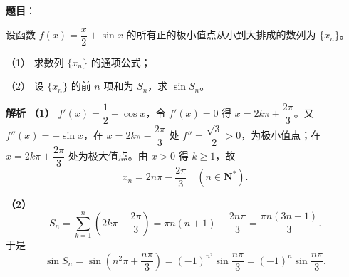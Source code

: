 \begin{answer}

\textbf{题目}：

设函数 $f(x)=\dfrac x2+\sin x$ 的所有正的极小值点从小到大排成的数列为 $\{x_n\}$。

（1） 求数列 $\{x_n\}$ 的通项公式；

（2） 设 $\{x_n\}$ 的前 $n$ 项和为 $S_n$，求 $\sin S_n$。

\textbf{解析}
\textbf{（1）} $f'(x)=\dfrac12+\cos x$，令 $f'(x)=0$ 得 $x=2k\pi\pm\dfrac{2\pi}3$。又 $f''(x)=-\sin x$，在 $x=2k\pi-\dfrac{2\pi}3$ 处 $f''=\dfrac{\sqrt3}2>0$，为极小值点；在 $x=2k\pi+\dfrac{2\pi}3$ 处为极大值点。由 $x>0$ 得 $k\geqslant1$，故
\nopagebreak[4]
\[x_n=2n\pi-\frac{2\pi}3\quad(n\in\mathbf N^*).\]

\textbf{（2）}
\nopagebreak[4]
\[S_n=\sum_{k=1}^n\left(2k\pi-\frac{2\pi}3\right)=\pi n(n+1)-\frac{2n\pi}3=\frac{\pi n(3n+1)}3.\]
于是
\nopagebreak[4]
\[\sin S_n=\sin\left(n^2\pi+\frac{n\pi}3\right)=(-1)^{n^2}\sin\frac{n\pi}3=(-1)^n\sin\frac{n\pi}3.\]



\end{answer}